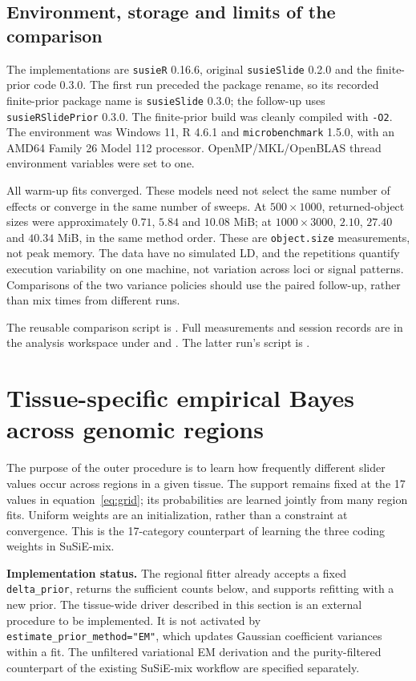 \documentclass[11pt]{article}
\newcommand{\pkg}{\texttt{susieRSlidePrior}}
\begin{document}
\subsection{Environment, storage and limits of the comparison}
The implementations are \texttt{susieR} 0.16.6, original
\texttt{susieSlide} 0.2.0 and the finite-prior code 0.3.0.
The first run preceded the package rename, so its recorded finite-prior
package name is \texttt{susieSlide} 0.3.0; the follow-up uses
\pkg{} 0.3.0. The finite-prior build was cleanly compiled with
\texttt{-O2}. The environment was Windows 11, R 4.6.1 and
\texttt{microbenchmark} 1.5.0, with an AMD64 Family 26 Model 112 processor.
OpenMP/MKL/OpenBLAS thread environment variables were set to one.

All warm-up fits converged. These models need not select the same number
of effects or converge in the same number of sweeps. At $500\times1000$,
returned-object sizes were approximately $0.71$, $5.84$ and $10.08$ MiB;
at $1000\times3000$, $2.10$, $27.40$ and $40.34$ MiB, in the same method
order. These are \texttt{object.size} measurements, not peak memory.
The data have no simulated LD, and the repetitions quantify execution
variability on one machine, not variation across loci or signal patterns.
Comparisons of the two variance policies should use the paired
follow-up, rather than mix times from different runs.

The reusable comparison script is
. Full measurements and
session records are in the analysis workspace under
 and
.
The latter run's script is .

\section{Tissue-specific empirical Bayes across genomic regions}
\label{sec:outer}
The purpose of the outer procedure is to learn how frequently different
slider values occur across regions in a given tissue. The support remains
fixed at the 17 values in equation~\eqref{eq:grid}; its probabilities are
learned jointly from many region fits. Uniform weights are an initialization,
rather than a constraint at convergence. This is the 17-category counterpart
of learning the three coding weights in SuSiE-mix.

\textbf{Implementation status.} The regional fitter already accepts a fixed
\texttt{delta\_prior}, returns the sufficient counts below, and supports
refitting with a new prior. The tissue-wide driver described in this section
is an external procedure to be implemented. It is not activated by
\texttt{estimate\_prior\_method="EM"}, which updates Gaussian coefficient
variances within a fit. The unfiltered variational EM derivation and the
purity-filtered counterpart of the existing SuSiE-mix workflow are specified
separately.
\end{document}
